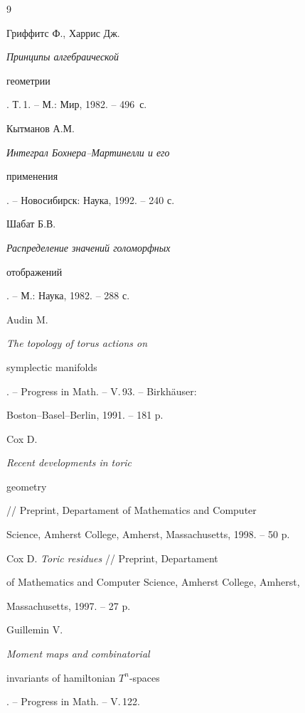 \begin{thebibliography}{9}







Гриффитс Ф., Харрис Дж. {\it Принципы  алгебраической


геометрии}. Т.\,1. -- М.: Мир, 1982. -- 496~с.







Кытманов А.М. {\it Интеграл Бохнера--Мартинелли и его


применения}. -- Новосибирск: Наука, 1992. -- 240 с.







Шабат Б.В. {\it Распределение значений голоморфных


отображений}. -- М.: Наука, 1982. -- 288 с.







Audin M. {\it The topology of torus actions on


symplectic manifolds}. -- Progress in Math. -- V.\,93. -- Birkh\"auser: 


Boston--Basel--Berlin, 1991. -- 181 p.







Cox D. {\it Recent developments in toric


geometry} // Preprint, Departament of Mathematics and Computer


Science, Amherst College, Amherst, Massachusetts, 1998. -- 50 p.







Cox D. {\it Toric residues} // Preprint, Departament


of Mathematics and Computer Science, Amherst College, Amherst,


Massachusetts, 1997. -- 27 p.







Guillemin V. {\it Moment maps and combinatorial


invariants of hamiltonian $T^n$-spaces}. -- Progress in Math. -- V.\,122.



\end{thebibliography}
